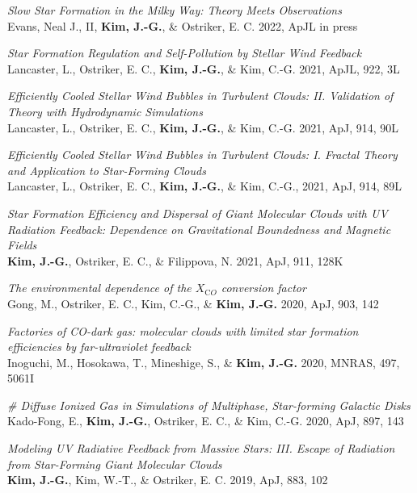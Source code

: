 \begin{benumerate}{16}
\item \textit{Slow Star Formation in the Milky Way: Theory Meets Observations}\\
  Evans, Neal J., II, \textbf{Kim, J.-G.}, \& Ostriker, E. C. 2022, ApJL in
  press
\item \textit{Star Formation Regulation and Self-Pollution by Stellar Wind
    Feedback}\\
  Lancaster, L., Ostriker, E. C., \textbf{Kim, J.-G.}, \& Kim, C.-G. 2021, ApJL,
  922, 3L
\item \textit{Efficiently Cooled Stellar Wind Bubbles in Turbulent Clouds:
    II. Validation of Theory with Hydrodynamic Simulations}\\
  Lancaster, L., Ostriker, E. C., \textbf{Kim, J.-G.}, \& Kim, C.-G. 2021, ApJ,
  914, 90L
\item \textit{Efficiently Cooled Stellar Wind Bubbles in Turbulent Clouds:
I. Fractal Theory and Application to Star-Forming Clouds}\\
  Lancaster, L., Ostriker, E. C., \textbf{Kim, J.-G.}, \& Kim, C.-G., 2021, ApJ,
914, 89L
\item \textit{Star Formation Efficiency and Dispersal of Giant Molecular
    Clouds with UV Radiation Feedback: Dependence on Gravitational Boundedness
    and Magnetic Fields} \\ \textbf{Kim, J.-G.}, Ostriker, E. C., \& Filippova,
  N. 2021, ApJ, 911, 128K
\item \textit{The environmental dependence of the $X_{\mathrm CO}$ conversion
    factor}\\ Gong, M., Ostriker, E. C., Kim, C.-G., \& \textbf{Kim,
    J.-G.} 2020, ApJ, 903, 142 
\item \textit{Factories of CO-dark gas: molecular clouds with limited star
formation efficiencies by far-ultraviolet feedback} \\
  Inoguchi, M., Hosokawa, T., Mineshige, S., \& \textbf{Kim, J.-G.} 2020, MNRAS,
  497, 5061I
\item \textit{\# Diffuse Ionized Gas in Simulations of Multiphase, Star-forming
    Galactic Disks}\\
  Kado-Fong, E., \textbf{Kim, J.-G.}, Ostriker, E. C., \& Kim, C.-G. 2020, ApJ,
  897, 143
\item \textit{Modeling UV Radiative Feedback from Massive Stars: III. Escape
    of Radiation from Star-Forming Giant Molecular Clouds} \\ \textbf{Kim,
    J.-G.}, Kim, W.-T., \& Ostriker, E. C. 2019, ApJ, 883, 102

\end{benumerate}
